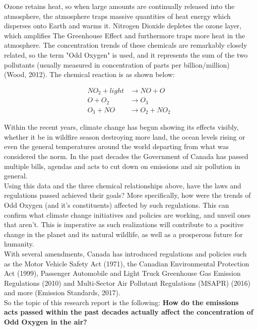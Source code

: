 \documentclass[fontsize=11pt]{article}
\begin{document}
Ozone retains heat, so when large amounts are continually released into the atmosphere, the atmosphere traps massive quantities of heat energy which disperses onto Earth and warms it. Nitrogen Dioxide depletes the ozone layer, which amplifies The Greenhouse Effect and furthermore traps more heat in the atmosphere. The concentration trends of these chemicals are remarkably closely related, so the term "Odd Oxygen" is used, and it represents the sum of the two pollutants (usually measured in concentration of parts per billion/million) (Wood, 2012). The chemical reaction is as shown below:

\begin{align*}
    NO_2 + light &\longrightarrow NO + O  \tag{direct affect on smog}\\
    O + O_2 &\longrightarrow O_3 \tag{direct affect on local temperature fluctuations}\\
    O_3 + NO &\longrightarrow O_2 + NO_2 \tag{direct relationship to air pollution}
\end{align*}

Within the recent years, climate change has begun showing its effects visibly, whether it be in wildfire season destroying more land, the ocean levels rising or even the general temperatures around the world departing from what was considered the norm. In the past decades the Government of Canada has passed multiple bills, agendas and acts to cut down on emissions and air pollution in general. \\

Using this data and the three chemical relationships above, have the laws and regulations passed achieved their goals? More specifically, how were the trends of Odd Oxygen (and it's constituents) affected by such regulations. This can confirm what climate change initiatives and policies are working, and unveil ones that aren't. This is imperative as such realizations will contribute to a positive change in the planet and its natural wildlife, as well as a prosperous future for humanity. \\

With several amendments, Canada has introduced regulations and policies such as the Motor Vehicle Safety Act (1971), the Canadian Environmental Protection Act (1999), Passenger Automobile and Light Truck Greenhouse Gas Emission Regulations (2010) and Multi-Sector Air Pollutant Regulations (MSAPR) (2016) and more (Emission Standards, 2017).\\

So the topic of this research report is the following: \textbf{How do the emissions acts passed within the past decades actually affect the concentration of Odd Oxygen in the air?}
\end{document}
